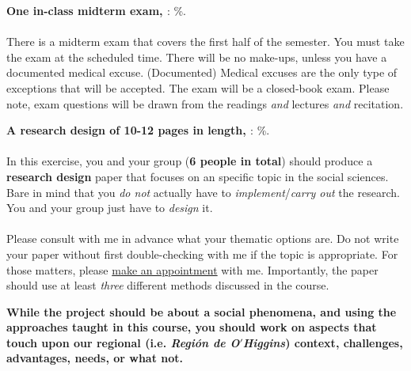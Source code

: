 \documentclass[letterpaper]{article}
\renewenvironment{itemize}{
  \begin{list}{}{
    \setlength{\leftmargin}{1.5em}
  }
}{
  \end{list}
}
\begin{document}
\begin{enumerate}
	\item {\bf One in-class midterm exam, \underline{{\unskip}}}: {\unskip}\%.
	\\ 
	\\
	There is a midterm exam that covers the first half of the semester. You must take the exam at the scheduled time. There will be no make-ups, unless you have a documented medical excuse. (Documented) Medical excuses are the only type of exceptions that will be accepted. The exam will be a closed-book exam. Please note, exam questions will be drawn from the readings \emph{and} lectures \emph{and} recitation.


	\item {\bf A research design of 10-12 pages in length, \underline{{\unskip}}}: {\unskip}\%.
	\\ 
	\\
	In this exercise, you and your group ({\bf 6 people in total}) should produce a {\bf research design} paper that focuses on an specific topic in the social sciences. Bare in mind that you \emph{do not} actually have to \emph{implement}/\emph{carry out} the research. You and your group just have to \emph{design} it.
	\\
	\\
	Please consult with me in advance what your thematic options are. Do not write your paper without first double-checking with me if the topic is appropriate. For those matters, please \href{https://calendly.com/bahamonde/officehours}{make an appointment} with me. Importantly, the paper should use at least \emph{three} different methods discussed in the course.

	\begin{itemize}
	\item[\Pointinghand] {\bf While the project should be about a social phenomena, and using the approaches taught in this course, {\color{blue}you should work on aspects that touch upon our regional} (i.e. \emph{Regi\'on de O$'$Higgins}) {\color{blue}context, challenges, advantages, needs, or what not.}}
	\end{itemize}


\end{enumerate}
\end{document}
